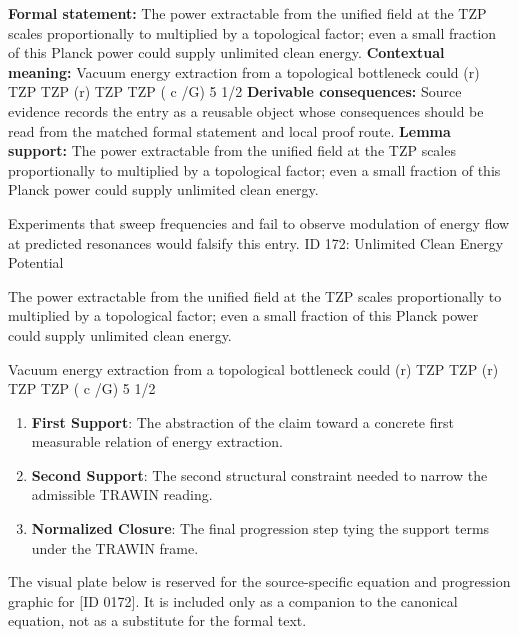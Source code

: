 \begingroup\footnotesize\setlength{\emergencystretch}{3em}\sloppy
\textbf{Formal statement:} The power extractable from the unified field at the TZP scales proportionally to multiplied by a topological factor; even a small fraction of this Planck power could supply unlimited clean energy.  
\textbf{Contextual meaning:} Vacuum energy extraction from a topological bottleneck could  (r)  TZP  TZP   (r) TZP  TZP  ( c /G) 5 1/2
\textbf{Derivable consequences:} Source evidence records the entry as a reusable object whose consequences should be read from the matched formal statement and local proof route.
\textbf{Lemma support:} The power extractable from the unified field at the TZP scales proportionally to multiplied by a topological factor; even a small fraction of this Planck power could supply unlimited clean energy.  \par
\endgroup

Experiments that sweep frequencies and fail to observe modulation of energy flow at predicted resonances would falsify this entry. ID 172: Unlimited Clean Energy Potential  

The power extractable from the unified field at the TZP scales proportionally to multiplied by a topological factor; even a small fraction of this Planck power could supply unlimited clean energy.  

Vacuum energy extraction from a topological bottleneck could  (r)  TZP  TZP   (r) TZP  TZP  ( c /G) 5 1/2
\endgroup

\begin{enumerate}[leftmargin=1.6em,itemsep=6pt,topsep=4pt]
\item \textbf{First Support}: The abstraction of the claim toward a concrete first measurable relation of energy extraction.
\item \textbf{Second Support}: The second structural constraint needed to narrow the admissible TRAWIN reading.
\item \textbf{Normalized Closure}: The final progression step tying the support terms under the TRAWIN frame.
\end{enumerate}

\begingroup\footnotesize\sloppy
The visual plate below is reserved for the source-specific equation and progression graphic for [ID 0172]. It is included only as a companion to the canonical equation, not as a substitute for the formal text.
\par\endgroup
\ifTZPDarkEdition
{}
\fi

